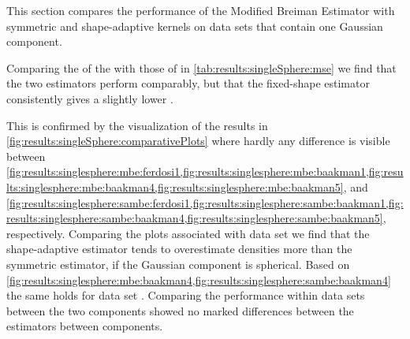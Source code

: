 
This section compares the performance of the Modified Breiman Estimator with symmetric and shape-adaptive kernels on data sets that contain one Gaussian component. 
	\begin{table}
		\centering
		
		\caption{Performance of the Modified Breiman Estimator with fixed-shaped and shape-adaptive kernels on the data sets with a single Gaussian component.} 	
		\label{tab:results:singleSphere:mse}
	\end{table}
	Comparing the \mses of the \mbe with those of \sambe in \cref{tab:results:singleSphere:mse} we find that the two estimators perform comparably, but that the fixed-shape estimator consistently gives a slightly lower \mse. 

	\begin{figure*}
		\centering
		
		\caption{The density as estimated by \mbe and \sambe as a function of the known density of data sets \ferdosiOne through \baakmanFive.}
		\label{fig:results:singleSphere:comparativePlots}
	\end{figure*}
	This is confirmed by the visualization of the results in \cref{fig:results:singleSphere:comparativePlots} where hardly any difference is visible between \cref{fig:results:singlesphere:mbe:ferdosi1,fig:results:singlesphere:mbe:baakman1,fig:results:singlesphere:mbe:baakman4,fig:results:singlesphere:mbe:baakman5}, and \cref{fig:results:singlesphere:sambe:ferdosi1,fig:results:singlesphere:sambe:baakman1,fig:results:singlesphere:sambe:baakman4,fig:results:singlesphere:sambe:baakman5}, respectively. 
		Comparing the plots associated with data set \ferdosiOne we find that the shape-adaptive estimator tends to overestimate densities more than the symmetric estimator, if the Gaussian component is spherical.
		Based on \cref{fig:results:singlesphere:mbe:baakman4,fig:results:singlesphere:sambe:baakman4} the same holds for data set \baakmanFour. 
	Comparing the performance within data sets between the two components showed no marked differences between the estimators between components.

